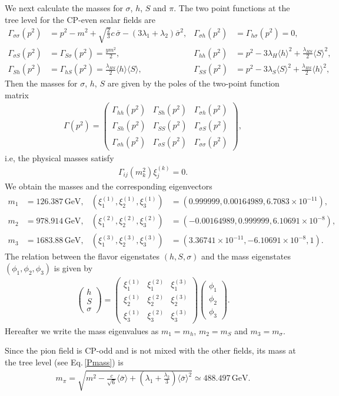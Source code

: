 \documentclass[a4paper,preprint,superscriptaddress,preprintnumbers,nofootinbib]{revtex4}
\newcommand{\al}[1]{\begin{align}#1\end{align}}
\newcommand{\nn}{\nonumber\\}
\newcommand{\pmat}[1]{\begin{pmatrix}#1\end{pmatrix}}
\newcommand{\fn}[1]{\!\left(#1\right)}
\newcommand{\bra}{\langle}
\newcommand{\ket}{\rangle}
\begin{document}
We next calculate the masses for $\sigma$, $h$, $S$ and $\pi$.
The two point functions at the tree level for the CP-even scalar fields are 
\al{
\Gamma_{\sigma\sigma}\fn{p^2}&=p^2-m^2+\sqrt{\frac{2}{3}}c\,{\bar \sigma}-(3\lambda_1+\lambda_2){\bar \sigma}^2,&
\Gamma_{\sigma h}\fn{p^2}&=\Gamma_{h\sigma}\fn{p^2}=0,&\nn
\Gamma_{\sigma S}\fn{p^2}&=\Gamma_{S\sigma }\fn{p^2}=\frac{ym^2}{2},&
\Gamma_{hh}\fn{p^2}&=p^2 -3\lambda_H \bra h\ket ^2 +\frac{\lambda_{HS}}{2}\bra S\ket^2,&\nn 
\Gamma_{Sh}\fn{p^2}&=\Gamma_{hS}\fn{p^2}=\frac{\lambda_{HS}}{2}\bra h\ket \bra S\ket,&
\Gamma_{SS}\fn{p^2}&=p^2 -3\lambda_S \bra S\ket^2 +\frac{\lambda_{HS}}{2}\bra h\ket^2,&
}
Then the masses for $\sigma$, $h$, $S$ are given by the poles of the two-point function matrix
\al{
\Gamma\fn{p^2}=\pmat{
\Gamma_{hh}\fn{p^2} & \Gamma_{Sh}\fn{p^2} & \Gamma_{\sigma h}\fn{p^2} \\
\Gamma_{Sh}\fn{p^2} & \Gamma_{SS}\fn{p^2} & \Gamma_{\sigma S}\fn{p^2}  \\
\Gamma_{\sigma h}\fn{p^2} &  \Gamma_{\sigma S}\fn{p^2} & \Gamma_{\sigma\sigma}\fn{p^2}
},
}
i.e, the physical masses satisfy 
\al{
\Gamma_{ij}\fn{m_k^2}\xi_j^{(k)}=0.
}
We obtain the masses and the corresponding eigenvectors
\al{
m_1&=126.387\,\text{GeV},&
(\xi_1^{(1)},\xi_2^{(1)},\xi_3^{(1)})&=(0.999999, 0.00164989, 6.7083\times10^{-11}),
\label{higgsmass}
\\
m_2&=978.914\,\text{GeV},&
(\xi_1^{(2)},\xi_2^{(2)},\xi_3^{(2)})&=(-0.00164989, 0.999999, 6.10691\times10^{-8}),
\label{sSmass}
\\
m_3&=1683.88\,\text{GeV},&
(\xi_1^{(3)},\xi_2^{(3)},\xi_3^{(3)})&=(3.36741\times 10^{-11}, -6.10691\times 10^{-8}, 1).
\label{sigmamass}
}
The relation between the flavor eigenstates $(h,S,\sigma)$ and the mass eigenstates $(\phi_1,\phi_2,\phi_3)$ is given by
\al{
\pmat{
h\\S\\ \sigma
}
=\pmat{
\xi_1^{(1)} & \xi_1^{(2)} & \xi_1^{(3)}\\
\xi_2^{(1)} & \xi_2^{(2)} & \xi_2^{(3)}\\
\xi_3^{(1)} & \xi_3^{(2)} & \xi_3^{(3)}
}
\pmat{
\phi_1\\ \phi_2 \\ \phi_3
}.
}  
Hereafter we write the mass eigenvalues as $m_1=m_h$, $m_2=m_S$ and $m_3=m_\sigma$.

Since the pion field is CP-odd and is not mixed with the other fields, its mass at the tree level (see Eq.\,\eqref{Pmass}) is
\al{
m_\pi=\sqrt{m^2 
-\frac{c}{\sqrt{6}}\bra\bar \sigma\ket
+\left( \lambda_1 +\frac{\lambda_2}{3}\right)\bra\bar \sigma\ket^2}
\simeq 488.497\, \text{GeV}.
}
\end{document}
